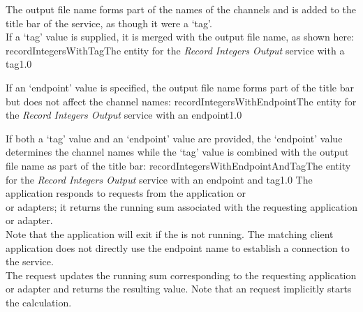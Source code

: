 The output file name forms part of the names of the channels and is added to the title bar
of the service, as though it were a `tag'.\\

If a `tag' value is supplied, it is merged with the output file name, as shown here:
%
{recordIntegersWithTag}{The \emph{\MMMU} entity for the \emph{Record Integers Output}
service with a tag}{1.0}

If an `endpoint' value is specified, the output file name forms part of the title bar but
does not affect the channel names:
%
{recordIntegersWithEndpoint}{The \emph{\MMMU} entity for the \emph{Record Integers Output}
service with an endpoint}{1.0}

If both a `tag' value and an `endpoint' value are provided, the `endpoint' value
determines the channel names while the `tag' value is combined with the output file name
as part of the title bar:
%
{recordIntegersWithEndpointAndTag}{The \emph{\MMMU} entity for the \emph{Record Integers
Output} service with an endpoint and tag}{1.0}
\condPage
{}
The  application responds to
requests from the  application or\\
 or
 adapters; it returns the running sum
associated with the requesting application or adapter.\\

Note that the application will exit if the  is not
running.
\insertAutoAppParameters
{}
The matching client application does not directly use the endpoint name to establish a
connection to the service.\\

The  request updates the running sum
corresponding to the requesting application or adapter and returns the resulting value.
Note that an  request implicitly starts the
calculation.\\
%

